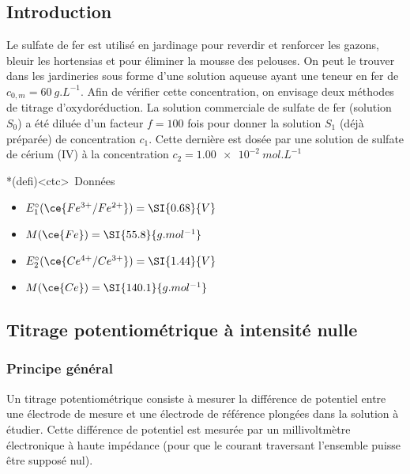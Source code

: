 \documentclass[../main/main.tex]{subfiles}
\begin{document}
{	\subsection{Introduction}
	Le sulfate de fer est utilisé en jardinage pour reverdir et renforcer les
	gazons, bleuir les hortensias et pour éliminer la mousse des pelouses. On peut
	le trouver dans les jardineries sous forme d'une solution aqueuse ayant une
	teneur en fer de $c_{0,m} = \SI{60}{g.L^{-1}}$. Afin de vérifier cette
	concentration, on envisage deux méthodes de titrage d'oxydoréduction.
	\bigbreak
	La solution commerciale de sulfate de fer (solution $S_0$) a été diluée d'un
	facteur $f = 100$ fois pour donner la solution $S_1$ (déjà préparée) de
	concentration $c_1$. Cette dernière est dosée par une solution de sulfate de
	cérium (IV) à la concentration $c_2 = \SI{1.00e-2}{mol.L^{-1}}$
	\begin{tcn}*(defi)<ctc>{\icondata~Données}
		\begin{itemize}
			\item $E_1^\circ(\ce{Fe^{3+}/Fe^{2+}}) = \SI{0.68}{V}$
			\item $M (\ce{Fe}) = \SI{55.8}{g.mol^{-1}}$
			\item $E_2^\circ (\ce{Ce^{4+}/Ce^{3+}}) = \SI{1.44}{V}$
			\item $M (\ce{Ce}) = \SI{140.1}{g.mol^{-1}}$
		\end{itemize}
	\end{tcn}

	\subsection{Titrage potentiométrique à intensité nulle}
	\subsubsection{Principe général}
	Un titrage potentiométrique consiste à mesurer la différence de potentiel
	entre une électrode de mesure et une électrode de référence plongées dans la
	solution à étudier. Cette différence de potentiel est mesurée par un
	millivoltmètre électronique à haute impédance (pour que le courant traversant
	l'ensemble puisse être supposé nul).

}
\end{document}
